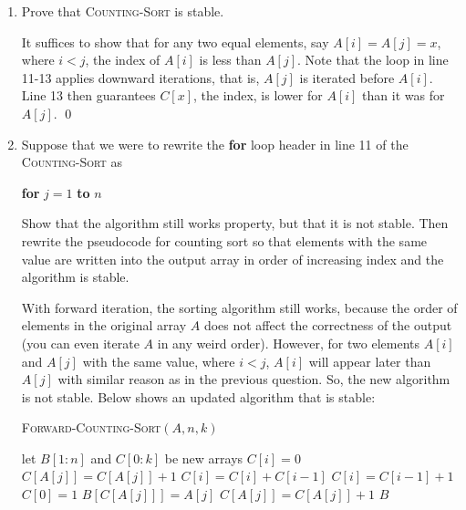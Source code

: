 \documentclass[12pt,reqno]{amsart}
\newif\ifanswer
\begin{document}
\begin{enumerate}[1.]
\item Prove that \textsc{Counting-Sort} is stable.
\vspace{0.5cm}

\ifanswer
{}

\noindent It suffices to show that for any two equal elements, say $A[i] = A[j] = x$, where $i < j$, the index of $A[i]$ is less than $A[j]$. Note that the loop in line 11-13 applies downward iterations, that is, $A[j]$ is iterated before $A[i]$. Line 13 then guarantees $C[x]$, the index, is lower for $A[i]$ than it was for $A[j]$. \qed
\vspace{1cm}



\item Suppose that we were to rewrite the \textbf{for} loop header in line 11 of the \textsc{Counting-Sort} as \begin{center} \textbf{for} $j = 1$ \textbf{to} $n$ \end{center} Show that the algorithm still works property, but that it is not stable. Then rewrite the pseudocode for counting sort so that elements with the same value are written into the output array in order of increasing index and the algorithm is stable.
\vspace{0.5cm}

\ifanswer
{}

\noindent With forward iteration, the sorting algorithm still works, because the order of elements in the original array $A$ does not affect the correctness of the output (you can even iterate $A$ in any weird order). However, for two elements $A[i]$ and $A[j]$ with the same value, where $i < j$, $A[i]$ will appear later than $A[j]$ with similar reason as in the previous question. So, the new algorithm is not stable. Below shows an updated algorithm that is stable:
\begin{algorithm}
    \caption{\textsc{Forward-Counting-Sort}$(A, n, k)$}
    \begin{algorithmic}[1]
        \STATE let $B[1:n]$ and $C[0:k]$ be new arrays
            \STATE $C[i] = 0$
        \ENDFOR
            \STATE $C[A[j]] = C[A[j]] + 1$
        \ENDFOR
            \STATE $C[i] = C[i] + C[i - 1]$
        \ENDFOR
            \STATE $C[i] = C[i - 1] + 1$
        \ENDFOR
        \STATE $C[0] = 1$
            \STATE $B[C[A[j]]] = A[j]$
            \STATE $C[A[j]] = C[A[j]] + 1$
        \ENDFOR
        \RETURN $B$
    \end{algorithmic}
\end{algorithm}
\vspace{1cm}




\end{enumerate}
\end{document}
